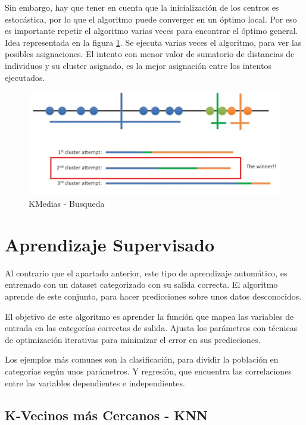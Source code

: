 		Sin embargo, hay que tener en cuenta que la inicialización de los centros es estocástica, por lo que el algoritmo puede converger en un óptimo local. Por eso es importante repetir el algoritmo varias veces para encontrar el óptimo general. Idea representada en la figura \ref{fig:kmediasBusqueda}. Se ejecuta varias veces el algoritmo, para ver las posibles asignaciones. El intento con menor valor de sumatorio de distancias de individuos y su cluster asignado, es la mejor asignación entre los intentos ejecutados.



		\begin{figure}[!h]
			\centering
			\includegraphics[width=1\textwidth]{images/chapter_2/kmedias}
			\caption{KMedias - Busqueda}
			\label{fig:kmediasBusqueda}
		\end{figure}


\section{Aprendizaje Supervisado}
	Al contrario que el apartado anterior, este tipo de aprendizaje automático, es entrenado con un dataset categorizado con su salida correcta. El algoritmo aprende de este conjunto, para hacer predicciones sobre unos datos desconocidos.
	
	El objetivo de este algoritmo es aprender la función que mapea las variables de entrada en las categorías correctas de salida. Ajusta los parámetros con técnicas de optimización iterativas para minimizar el error en sus predicciones.
	
	Los ejemplos más comunes son la clasificación, para dividir la población en categorías según unos parámetros. Y regresión, que encuentra las correlaciones entre las variables dependientes e independientes.


	\subsection{K-Vecinos más Cercanos - KNN}

